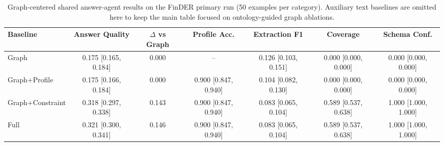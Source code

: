 \begin{table}[t]
\centering
\caption{Graph-centered shared answer-agent results on the FinDER primary run (50 examples per category). Auxiliary text baselines are omitted here to keep the main table focused on ontology-guided graph ablations.}
\label{tab:primary-graph-results}
\begin{tabular}{lcccccc}
\toprule
Baseline & Answer Quality & $\Delta$ vs Graph & Profile Acc. & Extraction F1 & Coverage & Schema Conf. \\
\midrule
Graph & 0.175 [0.165, 0.184] & 0.000 & -- & 0.126 [0.103, 0.151] & 0.000 [0.000, 0.000] & 0.000 [0.000, 0.000] \\
Graph+Profile & 0.175 [0.166, 0.184] & 0.000 & 0.900 [0.847, 0.940] & 0.104 [0.082, 0.130] & 0.000 [0.000, 0.000] & 0.000 [0.000, 0.000] \\
Graph+Constraint & 0.318 [0.297, 0.338] & 0.143 & 0.900 [0.847, 0.940] & 0.083 [0.065, 0.104] & 0.589 [0.537, 0.638] & 1.000 [1.000, 1.000] \\
Full & 0.321 [0.300, 0.341] & 0.146 & 0.900 [0.847, 0.940] & 0.083 [0.065, 0.104] & 0.589 [0.537, 0.638] & 1.000 [1.000, 1.000] \\
\bottomrule
\end{tabular}
\end{table}
